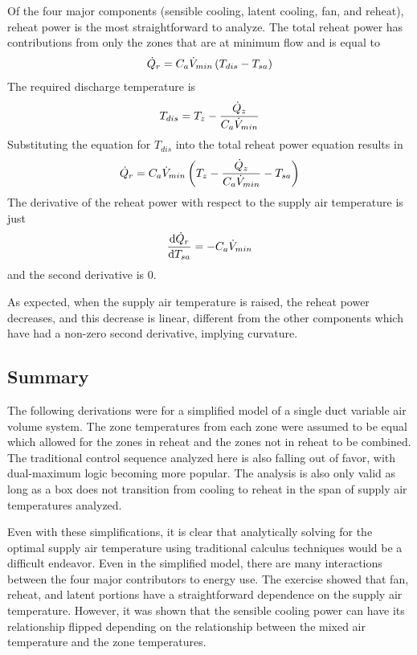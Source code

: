 Of the four major components (sensible cooling, latent cooling, fan, and
reheat), reheat power is the most straightforward to analyze. The total
reheat power has contributions from only the zones that are at minimum
flow and is equal to
\begin{equation}
    \dot{Q}_{r} = C_{a} \dot{V}_{min} \left(T_{dis} - T_{sa}{} \right)
\end{equation}
The required discharge temperature is
\begin{equation}
    T_{dis} = T_{z} - \frac{\dot{Q}_{z}}{C_{a} \dot{V}_{min} }
\end{equation}
Substituting the equation for \(T_{dis}\) into the total reheat power
equation results in
\begin{equation}
    \dot{Q}_{r} = C_{a} \dot{V}_{min} \left(T_{z} - \frac{\dot{Q}_{z}}{C_{a} \dot{V}_{min} } - T_{sa}{} \right) 
\end{equation}
The derivative of the reheat power with respect to the supply air
temperature is just
\begin{equation}
    \dv{\dot{Q}_{r}}{T_{sa}{}} = -C_{a} \dot{V}_{min}
\end{equation}
and the second derivative is 0. 

As expected, when the supply air temperature is raised, the reheat power
decreases, and this decrease is linear, different from the other
components which have had a non-zero second derivative, implying
curvature. 

\subsection{Summary}

The following derivations were for a simplified model of a single duct
variable air volume system. The zone temperatures from each zone were
assumed to be equal which allowed for the zones in reheat and the zones
not in reheat to be combined. The traditional control sequence analyzed
here is also falling out of favor, with dual-maximum logic becoming more
popular. The analysis is also only valid as long as a box does not
transition from cooling to reheat in the span of supply air temperatures
analyzed. 

Even with these simplifications, it is clear that analytically solving
for the optimal supply air temperature using traditional calculus
techniques would be a difficult endeavor. Even in the simplified model, there are
many interactions between the four major contributors to energy use. The
exercise showed that fan, reheat, and latent portions have a
straightforward dependence on the supply air temperature. However, it
was shown that the sensible cooling power can have its relationship
flipped depending on the relationship between the mixed air temperature
and the zone temperatures. 

